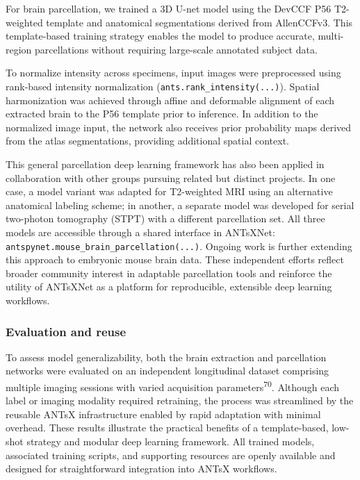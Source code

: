 \documentclass[
  12pt,
]{article}
\begin{document}
For brain parcellation, we trained a 3D U-net model using the DevCCF P56
T2-weighted template and anatomical segmentations derived from
AllenCCFv3. This template-based training strategy enables the model to
produce accurate, multi-region parcellations without requiring
large-scale annotated subject data.

To normalize intensity across specimens, input images were preprocessed
using rank-based intensity normalization
(\texttt{ants.rank\_intensity(...)}). Spatial harmonization was achieved
through affine and deformable alignment of each extracted brain to the
P56 template prior to inference. In addition to the normalized image
input, the network also receives prior probability maps derived from the
atlas segmentations, providing additional spatial context.

This general parcellation deep learning framework has also been applied
in collaboration with other groups pursuing related but distinct
projects. In one case, a model variant was adapted for T2-weighted MRI
using an alternative anatomical labeling scheme; in another, a separate
model was developed for serial two-photon tomography (STPT) with a
different parcellation set. All three models are accessible through a
shared interface in ANTsXNet:
\texttt{antspynet.mouse\_brain\_parcellation(...)}. Ongoing work is
further extending this approach to embryonic mouse brain data. These
independent efforts reflect broader community interest in adaptable
parcellation tools and reinforce the utility of ANTsXNet as a platform
for reproducible, extensible deep learning workflows.

\subsubsection{Evaluation and reuse}\label{evaluation-and-reuse}

To assess model generalizability, both the brain extraction and
parcellation networks were evaluated on an independent longitudinal
dataset comprising multiple imaging sessions with varied acquisition
parameters\textsuperscript{70}. Although each label or imaging modality
required retraining, the process was streamlined by the reusable ANTsX
infrastructure enabled by rapid adaptation with minimal overhead. These
results illustrate the practical benefits of a template-based, low-shot
strategy and modular deep learning framework. All trained models,
associated training scripts, and supporting resources are openly
available and designed for straightforward integration into ANTsX
workflows.
\end{document}
